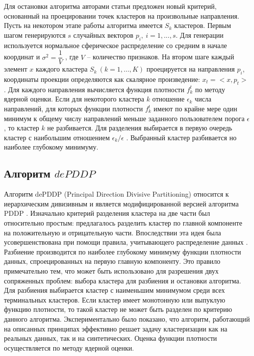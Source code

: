 \documentclass[12pt,twoside,a4paper,tikz,border=5]{refart}
\begin{document}
Для остановки алгоритма авторами статьи \cite{kovaleva} предложен новый критерий, основанный на проецировании точек кластеров на произвольные направления. Пусть на некотором этапе работы алгоритма имеется $ S_{k} $ кластеров. Первым шагом генерируются $ s $ случайных векторов $ p_{i},\:i=1,...,s $. Для генерации используется нормальное сферическое распределение со средним в начале координат и $ \sigma^{2}=\dfrac{1}{V} $ , где $ V $ – количество признаков. На втором шаге каждый элемент $ x $ каждого кластера $ S_{k}\:(k=1,...,K) $  проецируется на направления $ p_{i} $, координаты проекции определяются как скалярное произведение: $ x_{t}=<x,p_{t}> $ . Для каждого направления вычисляется функция плотности $ f_{k}^{t} $ по методу ядерной оценки. Если для некоторого кластера $ k $ отношение $ \epsilon_{k} $ числа направлений, для которых функции плотности  $ f_{k}^{t} $ имеют по крайне мере один минимум к общему числу направлений меньше заданного пользователем порога $ \epsilon $ , то кластер $ k $ не разбивается. Для разделения выбирается в первую очередь кластер с наибольшим отношением $ \epsilon_{k}/\epsilon $ . Выбранный кластер разбивается но наиболее глубокому минимуму.  

\subsection{Алгоритм $ dePDDP $}

Алгоритм dePDDP (Principal Direction Divisive Partitioning) относится к иерархическим дивизивным и является модифицированной версией алгоритма PDDP \cite{PDDP} . Изначально критерий разделения кластера на две части был относительно простым: предлагалось разделить кластер по главной компоненте на положительную и отрицательную части. Впоследствии эта идея была усовершенствована при помощи правила, учитывающего распределение данных \cite{tas}. Разбиение производится по наиболее глубокому минимуму функции плотности данных, спроецированных на первую главную компоненту. Это правило примечательно тем, что может быть использовано для разрешения двух сопряженных проблем: выбора кластера для разбиения и остановки алгоритма. Для разбиения выбирается кластер с наименьшим минимумом среди всех терминальных кластеров. Если кластер имеет монотонную или выпуклую функцию плотности, то такой кластер не может быть разделен по критерию данного алгоритма. Экспериментально было показано, что алгоритм, работающий на описанных принципах эффективно решает задачу кластеризации как на реальных данных, так и на синтетических. 
Оценка функции плотности осуществляется по методу ядерной оценки.
\end{document}
